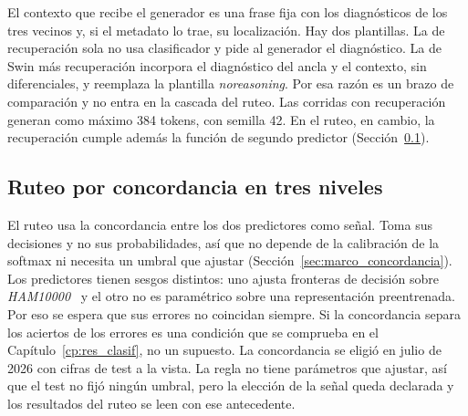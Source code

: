 El contexto que recibe el generador es una frase fija con los diagnósticos de los tres vecinos y, si el metadato lo
trae, su localización. Hay dos plantillas. La de recuperación sola no usa clasificador y pide al generador el
diagnóstico. La de Swin más recuperación incorpora el diagnóstico del ancla y el contexto, sin diferenciales, y
reemplaza la plantilla \emph{noreasoning}. Por esa razón es un brazo de comparación y no entra en la cascada del ruteo.
Las corridas con recuperación generan como máximo 384 tokens, con semilla 42. En el ruteo, en cambio, la recuperación
cumple además la función de segundo predictor (Sección~\ref{sec:met_ruteo}).

\subsection{Ruteo por concordancia en tres niveles}
\label{sec:met_ruteo}

El ruteo usa la concordancia entre los dos predictores como señal. Toma sus decisiones y no sus probabilidades, así que
no depende de la calibración de la softmax ni necesita un umbral que ajustar (Sección~\ref{sec:marco_concordancia}). Los
predictores tienen sesgos distintos: uno ajusta fronteras de decisión sobre \emph{HAM10000}~\cite{tschandl2018ham10000}
y el otro no es paramétrico sobre una representación preentrenada. Por eso se espera que sus errores no coincidan
siempre. Si la concordancia separa los aciertos de los errores es una condición que se comprueba en el
Capítulo~\ref{cp:res_clasif}, no un supuesto. La concordancia se eligió en julio de 2026 con cifras de test a la vista.
La regla no tiene parámetros que ajustar, así que el test no fijó ningún umbral, pero la elección de la señal queda
declarada y los resultados del ruteo se leen con ese antecedente.

